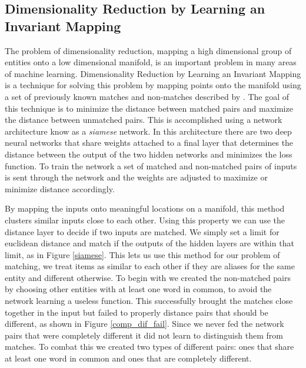 \subsection{Dimensionality Reduction by Learning an Invariant Mapping}

The problem of dimensionality reduction, mapping a high dimensional group of entities onto a low dimensional manifold, is an important problem in many areas of machine learning. Dimensionality Reduction by Learning an Invariant Mapping is a technique for solving this problem by mapping points onto the manifold using a set of previously known matches and non-matches described by \cite{Hasdell:Siamese}. The goal of this technique is to minimize the distance between matched pairs and maximize the distance between unmatched pairs. This is accomplished using a network architecture know as a \textit{siamese} network. In this architecture there are two deep neural networks that share weights attached to a final layer that determines the distance between the output of the two hidden networks and minimizes the loss function. To train the network a set of matched and non-matched pairs of inputs is sent through the network and the weights are adjusted to maximize or minimize distance accordingly.

By mapping the inputs onto meaningful locations on a manifold, this method clusters similar inputs close to each other. Using this property we can use the distance layer to decide if two inputs are matched. We simply set a limit for euclidean distance and match if the outputs of the hidden layers are within that limit, as in Figure \ref{siamese}. This lets us use this method for our problem of matching, we treat items as similar to each other if they are aliases for the same entity and different otherwise. To begin with we created the non-matched pairs by choosing other entities with at least one word in common, to avoid the network learning a useless function. This successfully brought the matches close together in the input but failed to properly distance pairs that should be different, as shown in Figure \ref{comp_dif_fail}. Since we never fed the network pairs that were completely different it did not learn to distinguish them from matches. To combat this we created two types of different pairs: ones that share at least one word in common and ones that are completely different.

